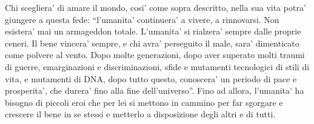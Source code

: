 Chi scegliera' di amare il mondo, cosi' come sopra descritto, nella sua vita potra' giungere a questa fede: ``l'umanita' continuera' a vivere, a rinnovarsi. Non esistera' mai un armageddon totale. L'umanita' si rialzera' sempre dalle proprie ceneri. Il bene vincera' sempre, e chi avra' perseguito il male, sara' dimenticato come polvere al vento. Dopo molte generazioni, dopo aver superato molti traumi di guerre, emarginazioni e discriminazioni, sfide e mutamenti tecnologici di stili di vita, e mutamenti di DNA, dopo tutto questo, conoscera' un periodo di pace e prosperita', che durera' fino alla fine dell'universo''. Fino ad allora, l'umanita' ha bisogno di piccoli eroi che per lei si mettono in cammino per far sgorgare e crescere il bene in se stessi e metterlo a disposizione degli altri e di tutti.

